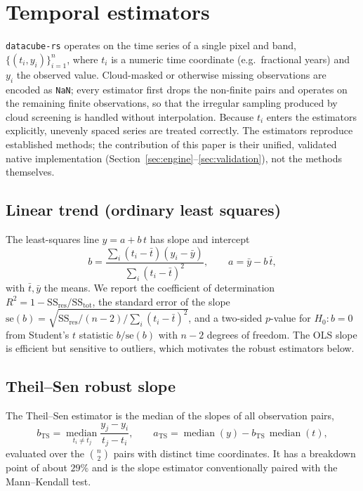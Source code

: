 \documentclass[review]{elsarticle}
\begin{document}
\section{Temporal estimators}
\label{sec:methods}

\texttt{datacube-rs} operates on the time series of a single pixel and band,
$\{(t_i, y_i)\}_{i=1}^{n}$, where $t_i$ is a numeric time coordinate (e.g.\
fractional years) and $y_i$ the observed value. Cloud-masked or otherwise
missing observations are encoded as \texttt{NaN}; every estimator first drops
the non-finite pairs and operates on the remaining finite observations, so that
the irregular sampling produced by cloud screening is handled without
interpolation. Because $t_i$ enters the estimators explicitly, unevenly spaced
series are treated correctly. The estimators reproduce established methods; the
contribution of this paper is their unified, validated native implementation
(Section~\ref{sec:engine}--\ref{sec:validation}), not the methods themselves.

\subsection{Linear trend (ordinary least squares)}
\label{sec:ols}
The least-squares line $y = a + b\,t$ has slope and intercept
\begin{equation}
b = \frac{\sum_i (t_i - \bar t)(y_i - \bar y)}{\sum_i (t_i - \bar t)^2},
\qquad
a = \bar y - b\,\bar t,
\end{equation}
with $\bar t, \bar y$ the means. We report the coefficient of determination
$R^2 = 1 - \mathrm{SS_{res}}/\mathrm{SS_{tot}}$, the standard error of the slope
$\mathrm{se}(b) = \sqrt{\mathrm{SS_{res}}/(n-2)\big/\sum_i (t_i-\bar t)^2}$, and a
two-sided $p$-value for $H_0\!: b = 0$ from Student's $t$ statistic
$b/\mathrm{se}(b)$ with $n-2$ degrees of freedom. The OLS slope is efficient but
sensitive to outliers, which motivates the robust estimators below.

\subsection{Theil--Sen robust slope}
\label{sec:theilsen}
The Theil--Sen estimator \citep{theil1950,sen1968} is the median of the slopes
of all observation pairs,
\begin{equation}
b_{\mathrm{TS}} = \operatorname*{median}_{\,t_i \neq t_j}
  \frac{y_j - y_i}{t_j - t_i},
\qquad
a_{\mathrm{TS}} = \operatorname{median}(y) - b_{\mathrm{TS}}\,\operatorname{median}(t),
\end{equation}
evaluated over the $\binom{n}{2}$ pairs with distinct time coordinates. It has a
breakdown point of about $29\%$ and is the slope estimator conventionally paired
with the Mann--Kendall test.
\end{document}
